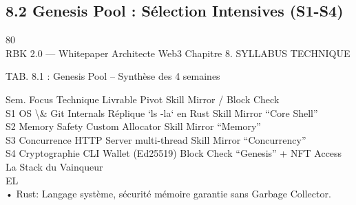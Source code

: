 \documentclass[12pt,landscape,a4paper]{article}
\begin{document}
\subsection{8.2 Genesis Pool : Sélection Intensives (S1-S4)}
\vspace{0.5em}
\vspace{0.5em}
80\\
RBK 2.0 — Whitepaper Architecte Web3                                                                                   Chapitre 8. SYLLABUS TECHNIQUE\\
\vspace{0.5em}
\vspace{0.5em}
\vspace{0.5em}
\vspace{0.5em}
\begin{center}\begin{tabular}TAB. 8.1 : Genesis Pool – Synthèse des 4 semaines\end{tabular}\end{center}
\vspace{0.5em}
\vspace{0.5em}
Sem.     Focus Technique        Livrable Pivot                Skill Mirror / Block Check\\
S1       OS \textbackslash{}& Git Internals     Réplique ‘ls -la‘ en Rust     Skill Mirror “Core Shell”\\
S2       Memory Safety          Custom Allocator              Skill Mirror “Memory”\\
S3       Concurrence            HTTP Server multi-thread      Skill Mirror “Concurrency”\\
S4       Cryptographie          CLI Wallet (Ed25519)          Block Check “Genesis” + NFT Access\\
\vspace{0.5em}
\vspace{0.5em}
La Stack du Vainqueur\\
\vspace{0.5em}
\vspace{0.5em}
\vspace{0.5em}
\vspace{0.5em}
EL\\
• Rust: Langage système, sécurité mémoire garantie sans Garbage Collector.\\
\vspace{0.5em}
\vspace{0.5em}
\vspace{0.5em}
\vspace{0.5em}
\end{document}
